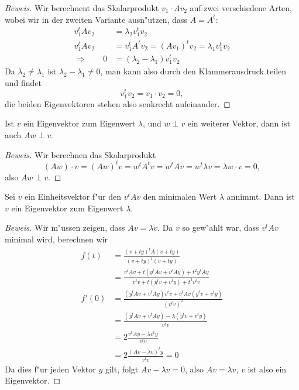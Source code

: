 \begin{proof}[Beweis]
Wir berechnent das Skalarprodukt $v_1\cdot Av_2$ auf zwei verschiedene
Arten, wobei wir in der zweiten Variante ausn"utzen, dass $A=A^t$:
\begin{align*}
v_1^tAv_2&=\lambda_2v_1^tv_2
\\
v_1^tAv_2&=v_1^tA^tv_2=(Av_1)^tv_2=\lambda_1v_1^tv_2
\\
\Rightarrow
\qquad
0&=(\lambda_2-\lambda_1)v_1^tv_2
\end{align*}
Da $\lambda_2\ne\lambda_1$ ist $\lambda_2-\lambda_1\ne 0$, man kann
also durch den Klammerausdruck teilen und findet
\[
v_1^tv_2=v_1\cdot v_2=0,
\]
die beiden Eigenvektoren stehen also senkrecht aufeinander.
\end{proof}

\begin{hilfssatz}
\label{ev-ortho}
Ist $v$ ein Eigenvektor zum Eigenwert $\lambda$, und $w\perp v$ ein weiterer
Vektor, dann ist auch $Aw\perp v$.
\end{hilfssatz}

\begin{proof}[Beweis]
Wir berechnen das Skalarprodukt
\[
(Aw)\cdot v=(Aw)^t v=w^tA^tv=w^tAv=w^t\lambda v=\lambda w\cdot v=0,
\]
also $Aw\perp v$.
\end{proof}

\begin{hilfssatz}
\label{ev-existenz}
Sei $v$ ein Einheitsvektor f"ur den $v^tAv$ den minimalen Wert $\lambda$ annimmt.
Dann ist $v$ ein Eigenvektor zum Eigenwert $\lambda$.
\end{hilfssatz}

\begin{proof}[Beweis]
Wir m"ussen zeigen, dass $Av=\lambda v$. Da $v$ so gew"ahlt war, dass
$v^tAv$ minimal wird, berechnen wir 
\begin{align*}
f(t)&=\frac{(v+ty)^tA(v+ty)}{(v+ty)^t(v+ty)}
\\
&=
\frac{v^tAv+t(y^tAv+v^tAy)+t^2y^tAy}{v^tv+t(y^tv+v^ty)+t^2v^tv}
\\
f'(0)
&=
\frac{ (y^tAv+v^tAy)v^tv + v^tAv(y^tv+v^ty) }{ (v^tv)^2 }
\\
&=
\frac{ (y^tAv+v^tAy) - \lambda (y^tv+v^ty) }{ v^tv }
\\
&=
2\frac{ v^tAy - \lambda v^ty }{ v^tv }
\\
&=
2\frac{ (Av - \lambda v)^ty }{ v^tv }=0
\end{align*}
Da dies f"ur jeden Vektor $y$ gilt, folgt $Av-\lambda v=0$, also
$Av=\lambda v$, $v$ ist also ein Eigenvektor.
\end{proof}

